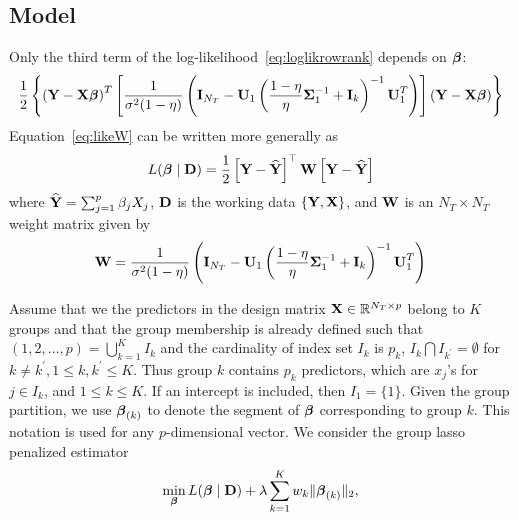 \subsection{Model}
Only the third term of the log-likelihood~\eqref{eq:loglikrowrank} depends on $\boldsymbol{\beta}$:
\begin{equation}
\frac{1}{2} \left\lbrace \left(\textbf{Y} - \textbf{X}\boldsymbol{\beta} \right)^T  \left[\frac{1}{\sigma^2(1-\eta)}\left(  \textbf{I}_{N_T} - \textbf{U}_1 \left(\frac{1-\eta}{\eta}\boldsymbol{\Sigma}_1^{-1} + \textbf{I}_{k}\right) ^{-1}\textbf{U}_1^T \right)  \right] \left(\textbf{Y} - \textbf{X}\boldsymbol{\beta} \right)  \right\rbrace \label{eq:likeW}
\end{equation}
Equation~\eqref{eq:likeW} can be written more generally as
\[
L(\boldsymbol{\beta}\mid\textbf{D})=\frac{1}{2}\left[\textbf{Y}-\widehat{\textbf{Y}}\right]^{\top}\mathbf{W}\left[\textbf{Y}-\widehat{\textbf{Y}}\right]
\]
where $\widehat{\textbf{Y}}=\sum_{j=1}^{p}\beta_{j}X_{j}$, $\textbf{D}$ is the working data $\lbrace \textbf{Y}, \textbf{X} \rbrace$, and $\textbf{W}$ is an $N_T \times N_T$ weight matrix given by
\begin{equation}
\textbf{W} = \frac{1}{\sigma^2(1-\eta)}\left(  \textbf{I}_{N_T} - \textbf{U}_1 \left(\frac{1-\eta}{\eta}\boldsymbol{\Sigma}_1^{-1} + \textbf{I}_{k}\right) ^{-1}\textbf{U}_1^T \right)   \label{eq:weight}
\end{equation}

Assume that we the predictors in the design matrix $\textbf{X} \in \mathbb{R}^{N_T \times p}$ belong to $K$ groups and that the group membership is already defined such that $(1,2,\ldots,p)=\bigcup_{k=1}^{K}I_{k}$ and the cardinality of index set $I_{k}$ is $p_{k}$, $I_{k}\bigcap I_{k^{\prime}}=\emptyset$ for $k\neq k^{\prime},1\le k,k^{\prime}\le K$. Thus group $k$ contains $p_{k}$ predictors, which are $x_{j}$'s for $j\in I_{k}$, and $1\le k\le K.$ If an intercept is included, then $I_{1}=\{1\}$. Given the group partition, we use $\boldsymbol{\beta}_{(k)}$ to denote the segment of $\boldsymbol{\beta}$ corresponding to group $k$. This notation is used for any $p$-dimensional vector.
We consider the group lasso penalized estimator
\begin{equation}
\min_{\boldsymbol{\beta}}L(\boldsymbol{\beta} \mid \textbf{D})+\lambda\sum_{k=1}^{K}w_{k}\|\boldsymbol{\beta}_{(k)}\|_{2},\label{eq:wlslasso}
\end{equation}

